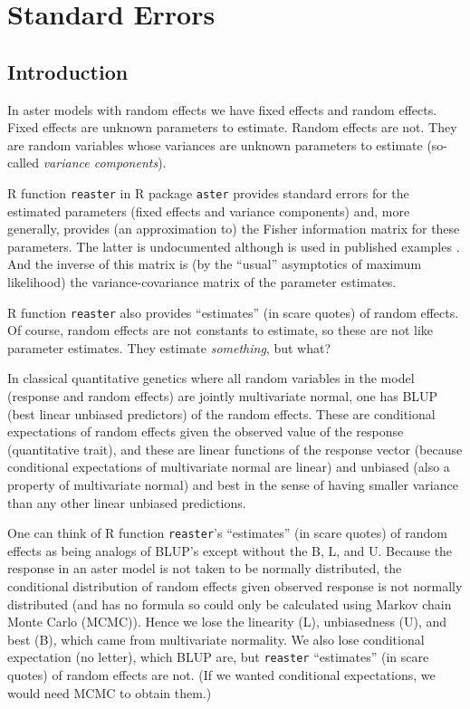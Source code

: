 \documentclass[11pt]{article}
\let\code=\texttt
\begin{document}
\section{Standard Errors}

\subsection{Introduction}

In aster models with random effects \citep*{reaster} we have fixed effects
and random effects.  Fixed effects are unknown parameters to estimate.
Random effects are not.  They are random variables whose variances are
unknown parameters to estimate (so-called \emph{variance components}).

R function \code{reaster} in R package \code{aster} \citep{aster-package}
provides standard errors for the estimated parameters (fixed effects and
variance components) and, more generally, provides (an approximation to)
the Fisher information matrix for these parameters.  The latter is
undocumented although is used in published examples
\citep[Supplementary material Section~12.3.1]{zenodo}.  And the inverse
of this matrix is (by the ``usual'' asymptotics of maximum likelihood)
the variance-covariance matrix of the parameter estimates.

R function \code{reaster} also provides ``estimates'' (in scare quotes)
of random effects.  Of course, random effects are not constants to estimate,
so these are not like parameter estimates.  They estimate \emph{something}, but
what?

In classical quantitative genetics where all random variables in the model
(response and random effects) are jointly multivariate normal, one has
BLUP (best linear unbiased predictors) of the random effects.  These
are conditional expectations of random effects given the observed value
of the response (quantitative trait), and these are linear functions
of the response vector (because conditional expectations of multivariate
normal are linear) and unbiased (also a property of multivariate normal)
and best in the sense of having smaller variance than any other linear
unbiased predictions.

One can think of R function \code{reaster}'s ``estimates'' (in scare quotes)
of random effects as being analogs of BLUP's except without the B, L, and U.
Because the response in an aster model is not taken to be normally distributed,
the conditional distribution of random effects given observed response is
not normally distributed (and has no formula so could only be calculated
using Markov chain Monte Carlo (MCMC)).  Hence we lose the linearity (L),
unbiasedness (U), and best (B), which came from multivariate normality.
We also lose conditional expectation (no letter), which BLUP are,
but \code{reaster} ``estimates'' (in scare quotes) of random effects are not.
(If we wanted conditional expectations, we would need MCMC to obtain them.)
\end{document}
